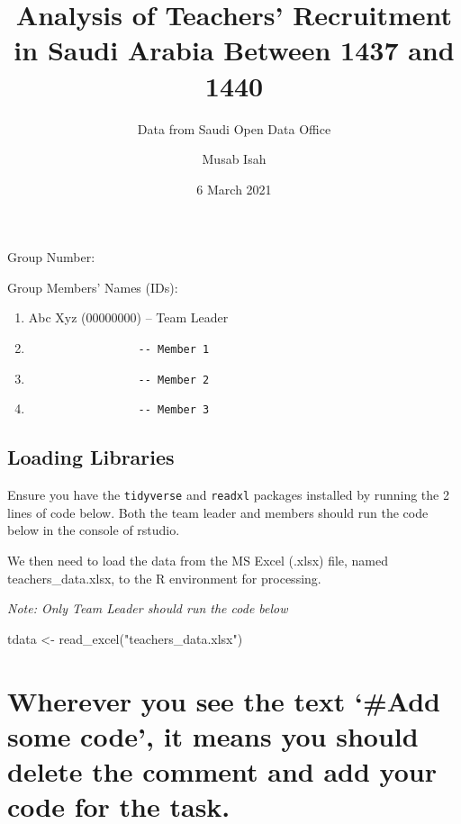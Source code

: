 \documentclass[
]{article}
\title{Analysis of Teachers' Recruitment in Saudi Arabia Between 1437
and 1440}
\subtitle{Data from Saudi Open Data Office}
\author{Musab Isah}
\date{6 March 2021}
\newenvironment{Shaded}{\begin{snugshade}}{\end{snugshade}}
\newcommand{\FunctionTok}[1]{\textcolor[rgb]{0.00,0.00,0.00}{#1}}
\newcommand{\NormalTok}[1]{#1}
\newcommand{\OtherTok}[1]{\textcolor[rgb]{0.56,0.35,0.01}{#1}}
\newcommand{\StringTok}[1]{\textcolor[rgb]{0.31,0.60,0.02}{#1}}
\begin{document}
\maketitle

Group Number:

Group Members' Names (IDs):

\begin{enumerate}
\def\labelenumi{\arabic{enumi}.}
\item
  Abc Xyz (00000000) -- Team Leader
\item
\begin{verbatim}
                 -- Member 1
\end{verbatim}
\item
\begin{verbatim}
                 -- Member 2
\end{verbatim}
\item
\begin{verbatim}
                 -- Member 3
\end{verbatim}
\end{enumerate}

\hypertarget{loading-libraries}{%
\subsection{Loading Libraries}\label{loading-libraries}}

Ensure you have the \texttt{tidyverse} and \texttt{readxl} packages
installed by running the 2 lines of code below. Both the team leader and
members should run the code below in the console of rstudio.

We then need to load the data from the MS Excel (.xlsx) file, named
teachers\_data.xlsx, to the R environment for processing.

\emph{Note: Only Team Leader should run the code below}

\begin{Shaded}
\begin{Highlighting}[]
\NormalTok{tdata }\OtherTok{\textless{}{-}} \FunctionTok{read\_excel}\NormalTok{(}\StringTok{"teachers\_data.xlsx"}\NormalTok{)}
\end{Highlighting}
\end{Shaded}

\hypertarget{wherever-you-see-the-text-add-some-code-it-means-you-should-delete-the-comment-and-add-your-code-for-the-task.}{%
\section{Wherever you see the text `\#Add some code', it means you
should delete the comment and add your code for the
task.}\label{wherever-you-see-the-text-add-some-code-it-means-you-should-delete-the-comment-and-add-your-code-for-the-task.}}
\end{document}
